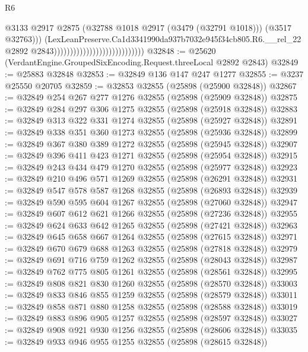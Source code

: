 \begin{lexlean}{R6}
\begin{coremodule}
                                                              @3133
                                                              @2917
                                                              @2875
                                                              (@32788
                                                                @1018
                                                                @2917
                                                                (@3479 (@32791 @1018)))
                                                              (@3517 @32763)))
                                                          (LexLeanPreserve.Ca1d3341990da937b7032e945f34cb805.R6.__rel_22
                                                            @2892
                                                            @2843))))))))))))))))))))))))))))
@32848 := @25620 (VerdantEngine.GroupedSixEncoding.Request.threeLocal @2892 @2843)
@32849 := @25883 @32848
@32853 := @32849 @136 @147 @247 @1277
@32855 := @3237 @25550 @20705
@32859 := @32853 @32855 (@25898 (@25900 @32848))
@32867 := @32849 @254 @267 @277 @1276 @32855 (@25898 (@25909 @32848))
@32875 := @32849 @284 @297 @306 @1275 @32855 (@25898 (@25918 @32848))
@32883 := @32849 @313 @322 @331 @1274 @32855 (@25898 (@25927 @32848))
@32891 := @32849 @338 @351 @360 @1273 @32855 (@25898 (@25936 @32848))
@32899 := @32849 @367 @380 @389 @1272 @32855 (@25898 (@25945 @32848))
@32907 := @32849 @396 @411 @423 @1271 @32855 (@25898 (@25954 @32848))
@32915 := @32849 @243 @434 @479 @1270 @32855 (@25898 (@25977 @32848))
@32923 := @32849 @210 @496 @571 @1269 @32855 (@25898 (@26291 @32848))
@32931 := @32849 @547 @578 @587 @1268 @32855 (@25898 (@26893 @32848))
@32939 := @32849 @590 @595 @604 @1267 @32855 (@25898 (@27060 @32848))
@32947 := @32849 @607 @612 @621 @1266 @32855 (@25898 (@27236 @32848))
@32955 := @32849 @624 @633 @642 @1265 @32855 (@25898 (@27421 @32848))
@32963 := @32849 @645 @658 @667 @1264 @32855 (@25898 (@27615 @32848))
@32971 := @32849 @670 @679 @688 @1263 @32855 (@25898 (@27818 @32848))
@32979 := @32849 @691 @716 @759 @1262 @32855 (@25898 (@28043 @32848))
@32987 := @32849 @762 @775 @805 @1261 @32855 (@25898 (@28561 @32848))
@32995 := @32849 @808 @821 @830 @1260 @32855 (@25898 (@28570 @32848))
@33003 := @32849 @833 @846 @855 @1259 @32855 (@25898 (@28579 @32848))
@33011 := @32849 @858 @871 @880 @1258 @32855 (@25898 (@28588 @32848))
@33019 := @32849 @883 @896 @905 @1257 @32855 (@25898 (@28597 @32848))
@33027 := @32849 @908 @921 @930 @1256 @32855 (@25898 (@28606 @32848))
@33035 := @32849 @933 @946 @955 @1255 @32855 (@25898 (@28615 @32848))

\end{coremodule}
\end{lexlean}

